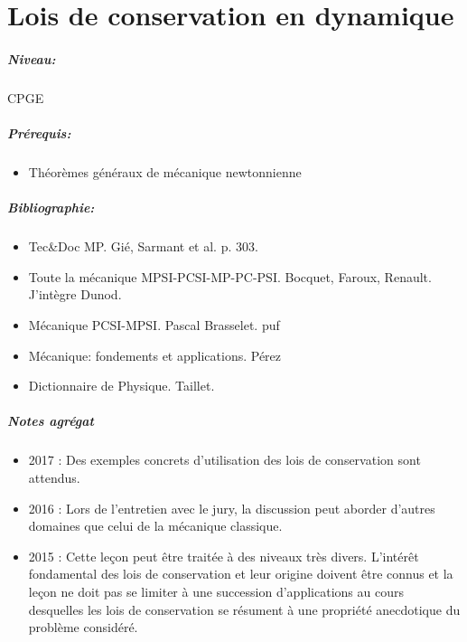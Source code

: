 \documentclass[11pt]{report}
\numberwithin{figure}{section}
\numberwithin{equation}{section}
\numberwithin{table}{section}
\newcommand{\1}{\boldsymbol{1}}
\begin{document}
\newpage




\chapter{Lois de conservation en dynamique}


\paragraph*{Niveau:} CPGE
\paragraph*{Prérequis:} 
\begin{itemize}
\item Théorèmes généraux de mécanique newtonnienne
\end{itemize}

\paragraph*{Bibliographie:}
\begin{itemize}
\item Tec\&Doc MP. Gié, Sarmant et al. p. 303.
\item Toute la mécanique MPSI-PCSI-MP-PC-PSI. Bocquet, Faroux, Renault. J'intègre Dunod.
\item Mécanique PCSI-MPSI. Pascal Brasselet. puf
\item Mécanique: fondements et applications. Pérez
\item Dictionnaire de Physique. Taillet.
\end{itemize}

\paragraph{Notes agrégat}
\begin{itemize}
\item 2017 : Des exemples concrets d’utilisation des lois de conservation sont attendus.
\item 2016 : Lors de l’entretien avec le jury, la discussion peut aborder d’autres domaines que
celui de la mécanique classique.
\item 2015 : Cette leçon peut être traitée à des niveaux très divers. L’intérêt fondamental des lois
de conservation et leur origine doivent être connus et la leçon ne doit pas se limiter à
une succession d’applications au cours desquelles les lois de conservation se résument à une propriété anecdotique du problème considéré.
\end{itemize}
\end{document}
